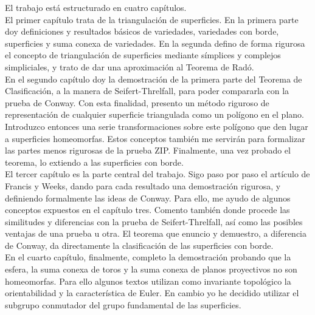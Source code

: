 \documentclass[10pt]{report}
\theoremstyle{definition}
\begin{document}
El trabajo está estructurado en cuatro capítulos.\\

El primer capítulo trata de la triangulación de superficies. En la primera parte doy definiciones y resultados básicos de variedades, variedades con borde, superficies y suma conexa de variedades. En la segunda defino de forma rigurosa el concepto de triangulación de superficies mediante símplices y complejos simpliciales, y trato de dar una aproximación al Teorema de Radó. \\ %

En el segundo capítulo doy la demostración de la primera parte del Teorema de Clasificación, a la manera de Seifert-Threlfall, para poder compararla con la prueba de Conway. Con esta finalidad, presento un método riguroso de representación de cualquier superficie triangulada como un polígono en el plano. Introduzco entonces una serie transformaciones sobre este polígono que den lugar a superficies homeomorfas. Estos conceptos también me servirán para formalizar las partes menos rigurosas de la prueba ZIP. Finalmente, una vez probado el teorema, lo extiendo a las superficies con borde.\\

El tercer capítulo es la parte central del trabajo. Sigo paso por paso el artículo de Francis y Weeks, dando para cada resultado una demostración rigurosa, y definiendo formalmente las ideas de Conway. Para ello, me ayudo de algunos conceptos expuestos en el capítulo tres. Comento también donde procede las similitudes y diferencias con la prueba de Seifert-Threlfall, así como las posibles ventajas de una prueba u otra. El teorema que enuncio y demuestro, a diferencia de Conway, da directamente la clasificación de las superficies con borde.\\

En el cuarto capítulo, finalmente, completo la demostración probando que la esfera, la suma conexa de toros y la suma conexa de planos proyectivos no son homeomorfas. Para ello algunos textos utilizan como invariante topológico la orientabilidad y la característica de Euler. En cambio yo he decidido utilizar el subgrupo conmutador del grupo fundamental de las superficies. \\
\end{document}
